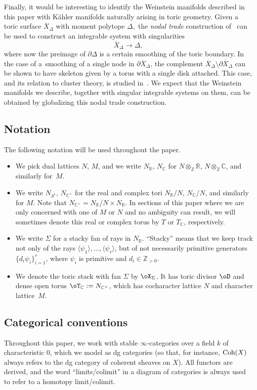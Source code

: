 \documentclass[pdftex]{sigma}%
\numberwithin{equation}{section}
\def\CC{\mathbb{C}}
\def\RR{\mathbb{R}}
\def\ZZ{\mathbb{Z}}
\newcommand{\Coh}{\textup{Coh}}
\begin{document}
Finally, it would be interesting to identify the Weinstein manifolds described in this paper with K\"ahler manifolds naturally arising in toric geometry. Given a toric surface $\overline{X}_\Delta$ with moment polytope $\Delta,$ the \textit{nodal trade} construction of~\cite{Sym} can be used to construct an integrable system with singularities
\[
    \overline{X}_\Delta\to \Delta,
\]
where now the preimage of $\partial \Delta$ is a certain smoothing of the toric boundary. In the case of a~smoothing of a single node in $\partial \overline{X}_\Delta$, the complement $\overline{X}_\Delta\setminus \partial \overline{X}_\Delta$ can be shown to have skeleton given by a torus with a single disk attached. This case, and its relation to cluster theory, is studied in~\cite{PT}.
We expect that the Weinstein manifolds we describe, together with singular integrable systems on them, can be obtained by globalizing this nodal trade construction.

\subsection*{Notation}
The following notation will be used throughout the paper.
\begin{itemize}\itemsep=0pt
 \item We pick dual lattices $N$, $M$, and we write $N_\RR$, $N_\CC$ for $N\otimes_\ZZ\RR$, $N\otimes_\ZZ\CC$, and similarly for~$M$.
 \item We write $N_{S^1}$, $N_{\CC^\times}$ for the real and complex tori $N_\RR/N$, $N_\CC/N$, and similarly for $M$. Note that $N_{\CC^\times} = N_\RR/N\times N_\RR$. In sections of this paper where we are only concerned with one of $M$ or $N$ and no ambiguity can result, we will sometimes denote this real or complex torus by $T$ or $T_\CC$, respectively.
 \item We write $\Sigma$ for a stacky fan of rays in $N_\RR$. ``Stacky'' means that we keep track not only of the rays $\langle \psi_1\rangle, \dots, \langle \psi_r\rangle$, but of not necessarily primitive generators $\{d_i\psi_i\}_{i=1}^r$, where $\psi_i$ is primitive and $d_i\in \ZZ_{>0}$.
 \item We denote the toric stack with fan $\Sigma$ by $\oX_\Sigma$. It has toric divisor $\oD$ and dense open torus $\oT_{\CC} := N_{\CC^\times}$, which has cocharacter lattice $N$ and character lattice~$M$.
\end{itemize}

\subsection*{Categorical conventions}
Throughout this paper, we work with stable $\infty$-categories over a field $k$ of characteristic 0, which we model as dg categories (so that, for instance, $\Coh(X)$ always refers to the dg category of coherent sheaves on $X$). All functors are derived, and the word ``limits/colimit'' in a diagram of categories is always used to refer to a homotopy limit/colimit.
\end{document}
